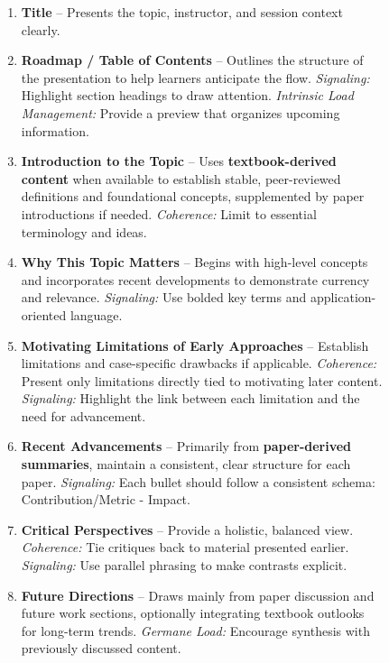 \documentclass[letterpaper]{article} %
\begin{document}
\begin{figure}
\begin{tcolorbox}[colback=gray!10,colframe=black!70,title=Annotated Structural Guide.]

\begin{enumerate}
    \item \textbf{Title} – Presents the topic, instructor, and session context clearly. 
    
    \item \textbf{Roadmap / Table of Contents} – Outlines the structure of the presentation to help learners anticipate the flow. 
    \textit{Signaling:} Highlight section headings to draw attention. 
    \textit{Intrinsic Load Management:} Provide a preview that organizes upcoming information.

    \item \textbf{Introduction to the Topic} – Uses \textbf{textbook-derived content} when available to establish stable, peer-reviewed definitions and foundational concepts, supplemented by paper introductions if needed. 
    \textit{Coherence:} Limit to essential terminology and ideas. 

    \item \textbf{Why This Topic Matters} – Begins with high-level concepts and incorporates recent developments to demonstrate currency and relevance. 
    \textit{Signaling:} Use bolded key terms and application-oriented language. 

    \item \textbf{Motivating Limitations of Early Approaches} – Establish limitations and case-specific drawbacks if applicable. 
    \textit{Coherence:} Present only limitations directly tied to motivating later content. 
    \textit{Signaling:} Highlight the link between each limitation and the need for advancement.

    \item \textbf{Recent Advancements} – Primarily from \textbf{paper-derived summaries}, maintain a consistent, clear structure for each paper. \textit{Signaling:} Each bullet should follow a consistent schema: Contribution/Metric - Impact. 
    

    \item \textbf{Critical Perspectives} – Provide a holistic, balanced view. 
    \textit{Coherence:} Tie critiques back to material presented earlier. 
    \textit{Signaling:} Use parallel phrasing to make contrasts explicit.

    \item \textbf{Future Directions} – Draws mainly from paper discussion and future work sections, optionally integrating textbook outlooks for long-term trends.  
    \textit{Germane Load:} Encourage synthesis with previously discussed content.


\end{enumerate}
\end{tcolorbox}
\end{figure}
\end{document}
